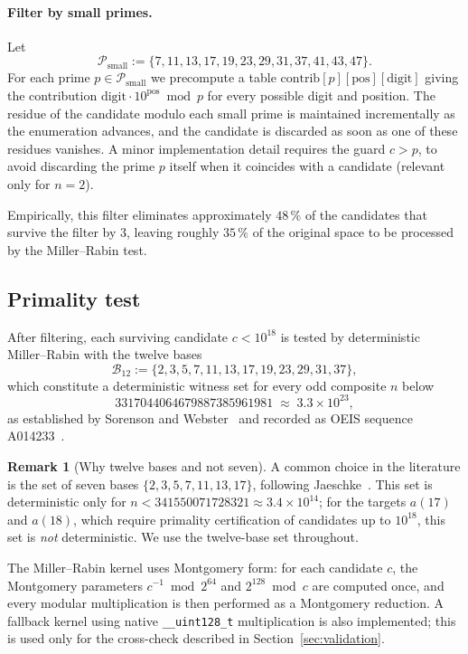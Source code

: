 \documentclass[11pt,a4paper]{article}
\theoremstyle{definition}
\newtheorem{remark}[theorem]{Remark}
\begin{document}
\paragraph{Filter by small primes.} Let
\[
  \mathcal{P}_{\mathrm{small}} :=
  \{7, 11, 13, 17, 19, 23, 29, 31, 37, 41, 43, 47\}.
\]
For each prime $p \in \mathcal{P}_{\mathrm{small}}$ we precompute a table
$\text{contrib}[p][\mathrm{pos}][\mathrm{digit}]$ giving
the contribution $\text{digit} \cdot 10^{\mathrm{pos}} \bmod p$ for every
possible digit and position. The residue of the candidate modulo each small
prime is maintained incrementally as the enumeration advances, and the
candidate is discarded as soon as one of these residues vanishes. A minor
implementation detail requires the guard $c > p$, to avoid discarding the
prime $p$ itself when it coincides with a candidate (relevant only for
$n = 2$).

Empirically, this filter eliminates approximately $48\,\%$ of the candidates
that survive the filter by $3$, leaving roughly $35\,\%$ of the original
space to be processed by the Miller--Rabin test.

\subsection{Primality test}\label{sec:mr}

After filtering, each surviving candidate $c < 10^{18}$ is tested by
deterministic Miller--Rabin with the twelve bases
\[
  \mathcal{B}_{12} := \{2, 3, 5, 7, 11, 13, 17, 19, 23, 29, 31, 37\},
\]
which constitute a deterministic witness set for every odd composite
$n$ below
\[
  \num{3317044064679887385961981} \;\approx\; 3.3 \times 10^{23},
\]
as established by Sorenson and Webster~\cite{SorensonWebster2017} and
recorded as OEIS sequence A014233~\cite{OEIS-A014233}.

\begin{remark}[Why twelve bases and not seven]
A common choice in the literature is the set of seven bases
$\{2, 3, 5, 7, 11, 13, 17\}$, following Jaeschke~\cite{Jaeschke1993}. This
set is deterministic only for
$n < \num{341550071728321} \approx 3.4 \times 10^{14}$; for the targets
$a(17)$ and $a(18)$, which require primality certification of candidates up to
$10^{18}$, this set is \emph{not} deterministic. We use the twelve-base set
throughout.
\end{remark}

The Miller--Rabin kernel uses Montgomery form: for each candidate $c$, the
Montgomery parameters $c^{-1} \bmod 2^{64}$ and $2^{128} \bmod c$ are
computed once, and every modular multiplication is then performed as a
Montgomery reduction. A fallback kernel using native
\texttt{\_\_uint128\_t} multiplication is also implemented; this is used
only for the cross-check described in
Section~\ref{sec:validation}.
\end{document}
